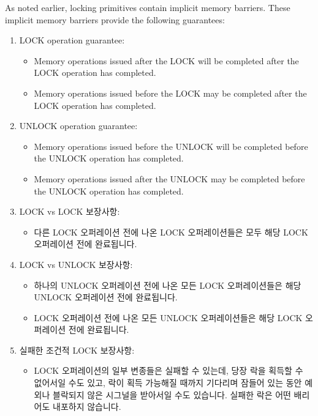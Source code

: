 \begin{enumerate}
\begin{enumerate}
As noted earlier, locking primitives contain implicit memory barriers.
These implicit memory barriers provide the following guarantees:
\begin{enumerate}
\item	LOCK operation guarantee:
	\begin{itemize}
	\item	Memory operations issued after the LOCK will be completed
		after the LOCK operation has completed.
	\item	Memory operations issued before the LOCK may be completed
		after the LOCK operation has completed.
	\end{itemize}
\item	UNLOCK operation guarantee:
	\begin{itemize}
	\item	Memory operations issued before the UNLOCK will be
		completed before the UNLOCK operation has completed.
	\item	Memory operations issued after the UNLOCK may be completed
		before the UNLOCK operation has completed.
	\end{itemize}
\fi
\item	LOCK vs LOCK 보장사항:
	\begin{itemize}
	\item	다른 LOCK 오퍼레이션 전에 나온 LOCK 오퍼레이션들은 모두 해당
		LOCK 오퍼레이션 전에 완료됩니다.
	\end{itemize}
\item	LOCK vs UNLOCK 보장사항:
	\begin{itemize}
	\item	하나의 UNLOCK 오퍼레이션 전에 나온 모든 LOCK 오퍼레이션들은
		해당 UNLOCK 오퍼레이션 전에 완료됩니다.
	\item	LOCK 오퍼레이션 전에 나온 모든 UNLOCK 오퍼레이션들은 해당 LOCK
		오퍼레이션 전에 완료됩니다.
	\end{itemize}
\item	실패한 조건적 LOCK 보장사항:
	\begin{itemize}
	\item	LOCK 오퍼레이션의 일부 변종들은 실패할  수 있는데, 당장 락을
		획득할 수 없어서일 수도 있고, 락이 획득 가능해질 때까지
		기다리며 잠들어 있는 동안 예외나 블락되지 않은 시그널을
		받아서일 수도 있습니다.
		실패한 락은 어떤 배리어도 내포하지 않습니다.
	\end{itemize}
\end{enumerate}
\iffalse


\end{enumerate}
\end{enumerate}
